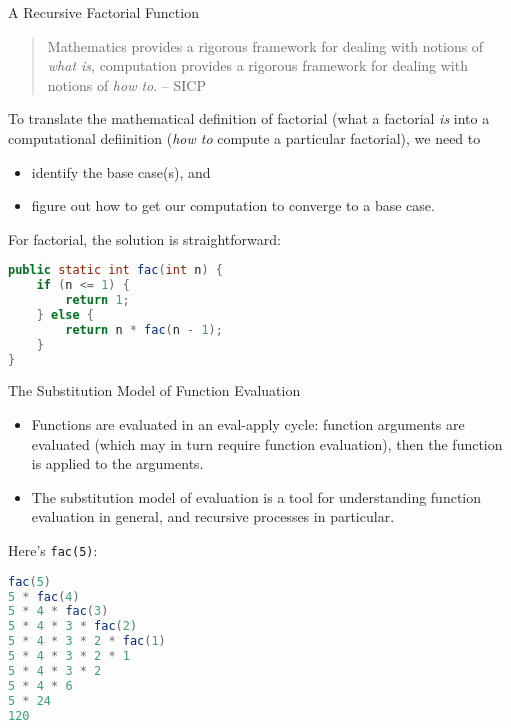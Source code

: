 \documentclass{beamer}
\begin{document}
\begin{frame}[fragile]{A Recursive Factorial Function}

\begin{quote}
Mathematics provides a rigorous framework for dealing with notions of {\em what is}, computation provides a rigorous framework for dealing with notions of {\em how to}. -- SICP
\end{quote}

To translate the mathematical definition of factorial (what a factorial {\it is} into a computational defiinition ({\it how to} compute a particular factorial), we need to
\begin{itemize}
\item identify the base case(s), and
\item figure out how to get our computation to converge to a base case.
\end{itemize}

For factorial, the solution is straightforward:
\begin{lstlisting}[language=Java]
public static int fac(int n) {
    if (n <= 1) {
        return 1;
    } else {
        return n * fac(n - 1);
    }
}
\end{lstlisting}

\end{frame}

\begin{frame}[fragile]{The Substitution Model of Function Evaluation}


\begin{itemize}
\item Functions are evaluated in an eval-apply cycle: function arguments are evaluated (which may in turn require function evaluation), then the function is applied to the arguments.
\item The substitution model of evaluation is a tool for understanding function evaluation in general, and recursive processes in particular.
\end{itemize}
Here's {\tt fac(5)}:
\vspace{-.05in}
\begin{lstlisting}[language=Java]
fac(5)
5 * fac(4)
5 * 4 * fac(3)
5 * 4 * 3 * fac(2)
5 * 4 * 3 * 2 * fac(1)
5 * 4 * 3 * 2 * 1
5 * 4 * 3 * 2
5 * 4 * 6
5 * 24
120
\end{lstlisting}


\end{frame}
\end{document}

